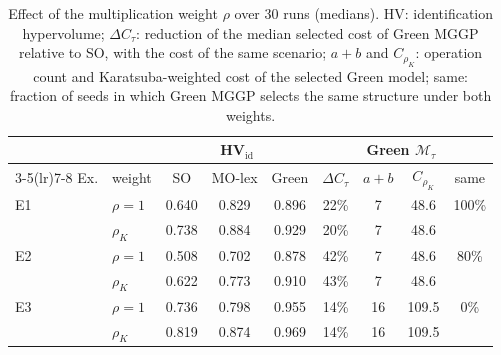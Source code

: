 \begin{table}[t]
\centering
\caption{Effect of the multiplication weight $\rho$ over 30 runs (medians). HV: identification hypervolume; $\Delta C_\tau$: reduction of the median selected cost of Green MGGP relative to SO, with the cost of the same scenario; $a{+}b$ and $C_{\rho_K}$: operation count and Karatsuba-weighted cost of the selected Green model; same: fraction of seeds in which Green MGGP selects the same structure under both weights.}
\label{tab:rho}
\setlength{\tabcolsep}{3.5pt}
\small
\begin{tabular}{llccccccc}
\toprule
 & & \multicolumn{3}{c}{HV$_\mathrm{id}$} & & \multicolumn{2}{c}{Green $\mathcal M_\tau$} & \\
\cmidrule(lr){3-5}\cmidrule(lr){7-8}
Ex. & weight & SO & MO-lex & Green & $\Delta C_\tau$ & $a{+}b$ & $C_{\rho_K}$ & same \\
\midrule
E1 & $\rho=1$ & 0.640 & 0.829 & 0.896 & 22\% & 7 & 48.6 & 100\% \\
 & $\rho_K$ & 0.738 & 0.884 & 0.929 & 20\% & 7 & 48.6 &  \\
\midrule
E2 & $\rho=1$ & 0.508 & 0.702 & 0.878 & 42\% & 7 & 48.6 & 80\% \\
 & $\rho_K$ & 0.622 & 0.773 & 0.910 & 43\% & 7 & 48.6 &  \\
\midrule
E3 & $\rho=1$ & 0.736 & 0.798 & 0.955 & 14\% & 16 & 109.5 & 0\% \\
 & $\rho_K$ & 0.819 & 0.874 & 0.969 & 14\% & 16 & 109.5 &  \\
\bottomrule
\end{tabular}
\end{table}
